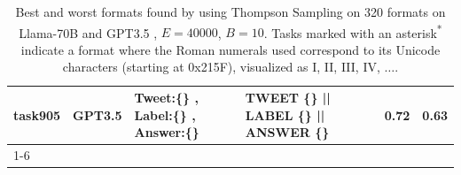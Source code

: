 \begin{longtable}{@{}p{0.8cm\tiny}p{1cm\tiny}p{4.1cm\ttfamily\tiny}p{4.1cm\ttfamily\tiny}p{0.8cm\tiny}p{0.8cm\tiny}@{}}
task905   & GPT3.5    & Tweet:\{\} ,  Label:\{\} ,  Answer:\{\}                                                                                                                                                                                                                                                                                                                                                                                                                                                                                 & TWEET \{\} || LABEL \{\} || ANSWER \{\}                                                                                                                                                                                                                                                                                                                                                                                                                                                                                                                                           & 0.72 & 0.63 \\ \cline{1-6}
\caption{Best and worst formats found by using Thompson Sampling on 320 formats on Llama-70B and GPT3.5 , $E=40000$, $B=10$. Tasks marked with an asterisk\textsuperscript{*} indicate a format where the Roman numerals used correspond to its Unicode characters (starting at 0x215F), visualized as I, II, III, IV, $\ldots$.}\label{table:best_worst}
\end{longtable}

